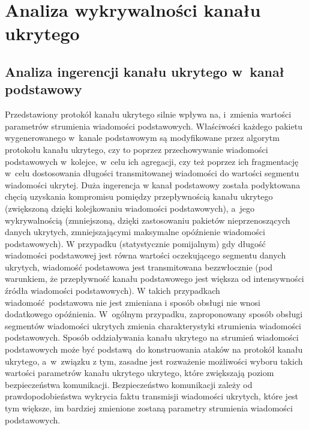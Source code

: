 \documentclass[a4paper, twoside, 12pt]{report}
\begin{document}
\chapter{Analiza wykrywalności kanału ukrytego}
    \section{Analiza ingerencji kanału ukrytego w~kanał podstawowy}
        Przedstawiony protokół kanału ukrytego silnie wpływa na, i~zmienia
        wartości parametrów strumienia wiadomości podstawowych. Właściwości każdego pakietu wygenerowanego
        w~kanale podstawowym są modyfikowane przez algorytm protokołu kanału ukrytego,
        czy to poprzez przechowywanie wiadomości podstawowych w~kolejce, w~celu
        ich agregacji, czy też
        poprzez ich fragmentację w~celu dostosowania długości transmitowanej wiadomości
        do wartości segmentu wiadomości ukrytej. Duża ingerencja w kanał podstawowy
        została podyktowana chęcią uzyskania kompromisu pomiędzy przepływnością
        kanału ukrytego (zwiększoną dzięki kolejkowaniu wiadomości podstawowych),
        a~jego wykrywalnością (zmniejszoną, dzięki zastosowaniu pakietów nieprzenoszących danych ukrytych,
        zmniejszającymi maksymalne opóźnienie wiadomości podstawowych).
        W przypadku (statystycznie pomijalnym) gdy długość wiadomości podstawowej
        jest równa wartości oczekującego segmentu danych ukrytych, wiadomość podstawowa
        jest transmitowana bezzwłocznie (pod warunkiem, że przepływność kanału podstawowego
        jest większa od intensywności źródła wiadomości podstawowych). W takich przypadkach
        wiadomość podstawowa nie jest zmieniana i sposób obsługi nie wnosi dodatkowego
        opóźnienia. W~ogólnym przypadku, zaproponowany sposób obsługi segmentów wiadomości
        ukrytych zmienia charakterystyki strumienia wiadomości podstawowych.
        Sposób oddziaływania kanału ukrytego na strumień wiadomości podstawowych
        może być podstawą do konstruowania ataków na protokół kanału ukrytego,
        a~w~związku z tym, zasadne jest rozważenie możliwości wyboru takich wartości
        parametrów kanału ukrytego ukrytego, które zwiększają poziom bezpieczeństwa
        komunikacji. Bezpieczeństwo komunikacji zależy od prawdopodobieństwa
        wykrycia faktu transmisji wiadomości ukrytych, które jest tym większe,
        im bardziej zmienione zostaną parametry strumienia wiadomości podstawowych.
\end{document}
